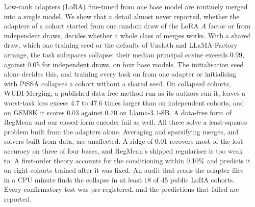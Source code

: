 Low-rank adapters (LoRA) fine-tuned from one base model are routinely merged
into a single model. We show that a detail almost never reported, whether the
adapters of a cohort started from one random draw of the LoRA $A$ factor or
from independent draws, decides whether a whole class of merges works. With a
shared draw, which one training seed or the defaults of Unsloth and
LLaMA-Factory arrange, the task subspaces collapse: their median principal
cosine exceeds 0.99, against 0.05 for independent draws, on four base models.
The initialisation seed alone decides this, and training every task on from
one adapter or initialising with PiSSA collapses a cohort without a shared
seed. On collapsed cohorts, WUDI-Merging, a published data-free method run as
its authors run it, leaves a worst-task loss excess 4.7 to 47.6 times larger
than on independent cohorts, and on GSM8K it scores 0.03 against 0.70 on
Llama-3.1-8B. A data-free form of RegMean and our closed-form encoder fail as
well. All three solve a least-squares problem built from the adapters alone.
Averaging and sparsifying merges, and solvers built from data, are unaffected.
A ridge of 0.01 recovers most of the lost accuracy on three of four bases, and
RegMean's shipped regulariser is too weak to. A first-order theory accounts for the conditioning
within 0.10\% and predicts it on eight cohorts trained after it was fixed. An
audit that reads the adapter files in a CPU minute finds the collapse in at
least 18 of 45 public LoRA cohorts. Every confirmatory test was pre-registered, and the
predictions that failed are reported.
